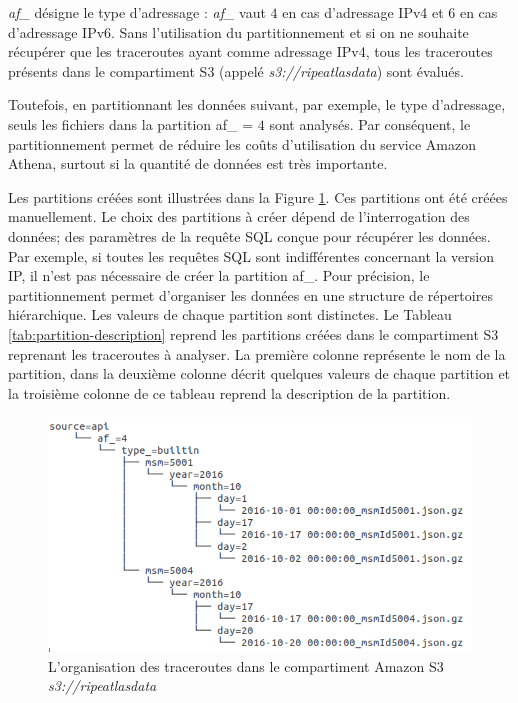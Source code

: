 \textit{af\_} désigne le type d'adressage : \textit{af\_} vaut $4$ en cas d'adressage IPv4 et $6$ en cas d'adressage IPv6. Sans l'utilisation du partitionnement et si on ne souhaite récupérer que  les traceroutes ayant comme adressage IPv4, tous les traceroutes présents dans le compartiment S3 (appelé \textit{s3://ripeatlasdata}) sont évalués.

Toutefois, en partitionnant les données suivant, par exemple, le type d'adressage, seuls les fichiers dans la partition
af\_ = $4$  sont analysés. Par conséquent, le partitionnement permet de réduire les coûts d'utilisation du service Amazon Athena, surtout si la quantité de données est très importante. 


Les partitions   créées sont illustrées  dans la Figure 	\ref{fig:partitionnement-athenaa}. Ces partitions ont été créées manuellement. Le choix des partitions à créer  dépend de l'interrogation des données; des paramètres de la requête SQL conçue pour récupérer  les données. Par exemple, si toutes les requêtes SQL  sont indifférentes concernant la version IP, il n'est pas nécessaire de créer la partition af\_. Pour précision, le partitionnement permet  d'organiser les données en une structure de répertoires hiérarchique. Les valeurs de chaque partition sont distinctes.
Le  Tableau \ref{tab:partition-description} 
reprend les  partitions créées dans le compartiment S3 reprenant les traceroutes à analyser.  La première colonne représente le nom de la partition, dans 
la deuxième colonne décrit quelques valeurs de chaque partition et la troisième colonne de ce tableau reprend la description de la partition.

\begin{figure}[h]
	\centering
	\captionsetup{justification=centering}
	\includegraphics[width=1\linewidth]{illustrations/partitionnement-athena}
	\caption{L'organisation des traceroutes dans le compartiment Amazon S3 \textit{s3://ripeatlasdata}}
	\label{fig:partitionnement-athenaa}
\end{figure}

